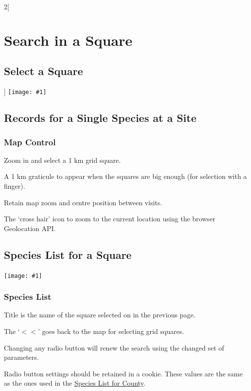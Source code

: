 \documentclass[a4paper,12pt,landscape]{article}
\newcommand{\wireframe}[1]{\texttt{[image: \#1]}\clearpage}
\begin{document}
\begin{multicols*}{2}[%
  \section{Search in a Square}%
  \subsection{Select a Square}%
]
\thispagestyle{empty}
\wireframe{./wireframes/Squares__Index.png}%

\subsection{Records for a Single Species at a Site}

\subsubsection*{Map Control}

\begin{todolist}
  \item Zoom in and select a 1 km grid square.
  \item A 1 km graticule to appear when the squares are big enough (for selection with a finger).
  \item Retain map zoom and centre position between visits.
  \item The `cross hair' icon to zoom to the current location using the browser Geolocation API.
\end{todolist}

\clearpage

\subsection{Species List for a Square}

\wireframe{./wireframes/Species__ListForSquare.png}%

\subsubsection*{Species List}

\begin{todolist}
  \item Title is the name of the square selected on in the previous page.
  \item The `$<<$' goes back to the map for selecting grid squares.
  \item Changing any radio button will renew the search using the changed set of parameters.
  \item Radio button settings should be retained in a cookie.
    These values are the same as the ones used in the \hyperref[sec:species-list-for-county]{Species List for County}.
\end{todolist}


\end{multicols*}
\end{document}
